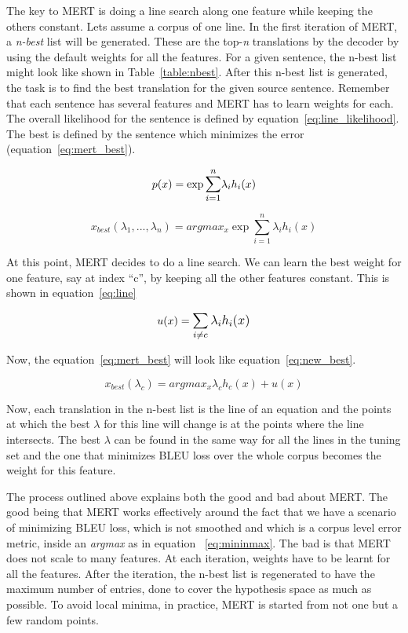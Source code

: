 The key to MERT is doing a line search along one feature while keeping the others constant. Lets assume a corpus of one line. In the first iteration of MERT, a \emph{n-best} list will be generated. These are the top-\emph{n} translations by the decoder by using the default weights for all the features. For a given sentence, the n-best list might look like shown in Table~\ref{table:nbest}. After this n-best list is generated, the task is to find the best translation for the given source sentence. Remember that each sentence has several features and MERT has to learn weights for each. The overall likelihood for the sentence is defined by equation~\eqref{eq:line_likelihood}. The best is defined by the sentence which minimizes the error (equation~\eqref{eq:mert_best}). 

\begin{equation} \label{eq:line_likelihood}
	p(x) = \exp\mathlarger{\sum_{i=1}^n}\lambda_{i}h_{i}(x)
\end{equation}

\begin{equation} \label{eq:mert_best}
	x_{best}(\lambda_{1}, ..., \lambda_{n}) = argmax_{x}\exp\sum_{i=1}^n \lambda_{i}h_{i}(x)
\end{equation}

At this point, MERT decides to do a line search. We can learn the best weight for one feature, say at index ``c'', by keeping all the other features constant. This is shown in equation~\eqref{eq:line}


\begin{equation} \label{eq:line}
	u(x) = \mathlarger{\sum_{i \neq c}\lambda_{i}h_{i}(x)}
\end{equation}

Now, the equation~\eqref{eq:mert_best} will look like equation~\eqref{eq:new_best}. 

\begin{equation} \label{eq:new_best}
	x_{best}(\lambda_{c}) = argmax_{x} \lambda_{c}h_{c}(x) + u(x)
\end{equation} 

Now, each translation in the n-best list is the line of an equation and the points at which the best $\lambda$ for this line will change is at the points where the line intersects. The best $\lambda$ can be found in the same way for all the lines in the tuning set and the one that minimizes BLEU loss over the whole corpus becomes the weight for this feature. 

The process outlined above explains both the good and bad about MERT. The good being that MERT works effectively around the fact that we have a scenario of minimizing BLEU loss, which is not smoothed and which is a corpus level error metric, inside an \emph{argmax} as in equation ~\eqref{eq:mininmax}. The bad is that MERT does not scale to many features. At each iteration, weights have to be learnt for all the features. After the iteration, the n-best list is regenerated to have the maximum number of entries, done to cover the hypothesis space as much as possible. To avoid local minima, in practice, MERT is started from not one but a few random points.



